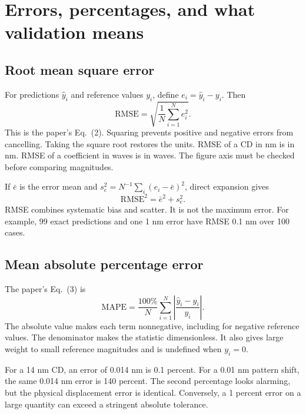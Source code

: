 \chapter{Errors, percentages, and what validation means}\label{ch:errors}

\section{Root mean square error}
For predictions $\hat y_i$ and reference values $y_i$, define
$e_i=\hat y_i-y_i$. Then
\begin{equation}
\mathrm{RMSE}=\sqrt{\frac1N\sum_{i=1}^Ne_i^2}.
\label{eq:RMSE}
\end{equation}
This is the paper's Eq.~(2). Squaring prevents positive and negative
errors from cancelling. Taking the square root restores the units.
RMSE of a CD in nm is in nm. RMSE of a coefficient in waves is in waves.
The figure axis must be checked before comparing magnitudes.

If $\bar e$ is the error mean and
$s_e^2=N^{-1}\sum_i(e_i-\bar e)^2$, direct expansion gives
\[
\mathrm{RMSE}^2=\bar e^2+s_e^2.
\]
RMSE combines systematic bias and scatter.
It is not the maximum error. For example, 99 exact predictions and one
1 nm error have RMSE 0.1 nm over 100 cases.

\section{Mean absolute percentage error}
The paper's Eq.~(3) is
\begin{equation}
\mathrm{MAPE}
=\frac{100\%}{N}\sum_{i=1}^N
\left|\frac{\hat y_i-y_i}{y_i}\right|.
\label{eq:MAPE}
\end{equation}
The absolute value makes each term nonnegative, including for negative
reference values. The denominator makes the statistic dimensionless.
It also gives large weight to small reference magnitudes and is undefined
when $y_i=0$.

For a 14 nm CD, an error of 0.014 nm is 0.1 percent.
For a 0.01 nm pattern shift, the same 0.014 nm error is 140 percent.
The second percentage looks alarming, but the physical displacement
error is identical. Conversely, a 1 percent error on a large quantity
can exceed a stringent absolute tolerance.


